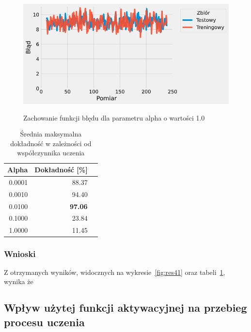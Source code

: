 \documentclass{article}
\begin{document}
\begin{figure}[H]
	\centering
	\caption{Zachowanie funkcji błędu dla parametru alpha o wartości 1.0}
	\includegraphics[width=\textwidth]{alpha_err_1.png}
	\label{fig:res47}
\end{figure}


\begin{table}[H]
	\caption{Średnia maksymalna dokładność w zależności od współczynnika uczenia}
	\label{tabela-res-41}
	\centering
	\begin{tabular}{rrr}
		\toprule
		Alpha  & Dokładność [\%] \\
		\midrule
		0.0001 & 88.37              \\
		0.0010 & 94.40              \\
		0.0100 & \textbf{97.06}     \\
		0.1000 & 23.84              \\
		1.0000 & 11.45              \\
		\bottomrule
	\end{tabular}
\end{table}

\subsubsection*{Wnioski}

Z otrzymanych wyników, widocznych na wykresie~\ref{fig:res41} oraz tabeli~\ref{tabela-res-41}, wynika że

\newpage
\subsection{Wpływ użytej funkcji aktywacyjnej na przebieg procesu uczenia}
\end{document}
